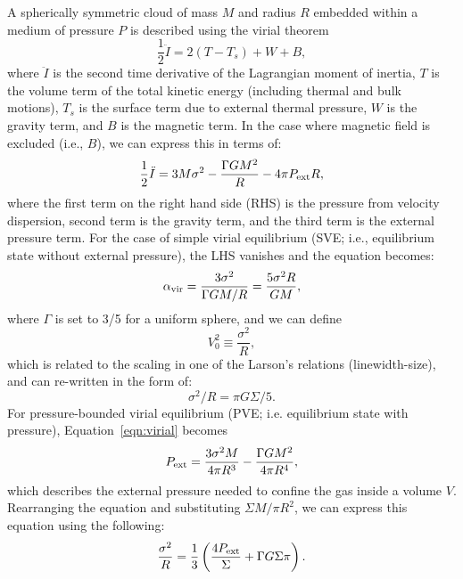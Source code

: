 \documentclass[apj]{emulateapj} %
\begin{document}
A spherically symmetric cloud of mass $M$ and radius $R$ embedded within 
a medium of pressure $P$ is described using the virial theorem
\begin{equation}
\frac{1}{2}\ddot I = 2(T - T_s) + W + B,
\end{equation}
where $\ddot I$ is the second time derivative of the Lagrangian moment of inertia,
$T$ is the volume term of the total kinetic energy (including thermal and 
bulk motions), $T_s$ is the surface term due to external thermal pressure, 
$W$ is the gravity term, and $B$ is the magnetic term.
In the case where magnetic field is excluded (i.e., $B$), we can express this in terms of:
\begin{equation}
\frac{1}{2}\ddot I = 3 M \sigma^2 - \frac{\Gamma GM^2}{R} - 4\pi P_{\rm ext} R,
\label{eqn:virial}
\end{equation}
where the first term on the right hand side (RHS) is the pressure from velocity dispersion, second 
term is the gravity term, and the third term is the external pressure term.
For the case of simple virial equilibrium (SVE; i.e., equilibrium state without external pressure), 
the LHS vanishes and the equation becomes:
\begin{equation}
\alpha_{\rm vir} = \frac{3\sigma^2}{\Gamma GM/R} = \frac{5\sigma^2R}{GM},
\end{equation}
where $\Gamma$ is set to 3/5 for a uniform sphere, and we can define
\begin{equation}
V_0^2\equiv\frac{\sigma^2}{R},
\end{equation}
which is related to the scaling in one of the Larson's relations (linewidth-size), 
and can re-written in the form of: 
\begin{equation}
\sigma^2/R = \pi G \Sigma/5.
\end{equation}
For pressure-bounded virial equilibrium (PVE; i.e. equilibrium state with pressure), Equation~\ref{eqn:virial} becomes 
\begin{equation}
P_{\rm ext} = \frac{3\sigma^2M}{4\pi R^3} - \frac{\Gamma G M^2}{4\pi R^4},
\label{eqn:pext}
\end{equation}
which describes the external pressure needed to confine the gas inside a volume $V$.
Rearranging the equation and substituting $\Sigma$\eq$M/\pi R^2$, we can express 
this equation using the following:
\begin{equation}
\frac{\sigma^2}{R} = \frac{1}{3}\left(\frac{4P_{\rm ext}}{\Sigma} + \Gamma G \Sigma \pi \right).
\label{eqn:v0}
\end{equation}
\end{document}
